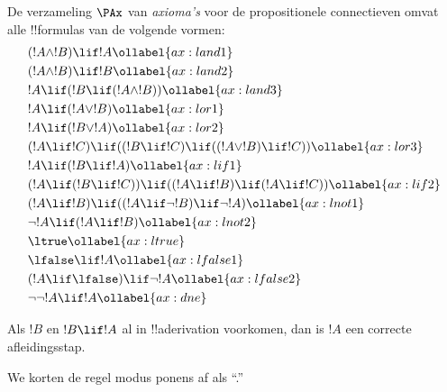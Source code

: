 \documentclass[../../../include/open-logic-section]{subfiles}
\begin{document}
      {}
      {}


\begin{defn}[Axioma's]
De verzameling $\PAx$ van \emph{axioma's} voor de propositionele
connectieven omvat alle !!{formula}s van de volgende vormen:
\begin{align}
  & (!A \land !B) \lif !A \ollabel{ax:land1}\\
  & (!A \land !B) \lif !B \ollabel{ax:land2}\\
  & !A \lif (!B \lif (!A \land !B)) \ollabel{ax:land3}\\
  & !A \lif (!A \lor !B) \ollabel{ax:lor1}\\
  & !A \lif (!B \lor !A) \ollabel{ax:lor2}\\
  & (!A \lif !C) \lif ((!B \lif !C) \lif ((!A \lor !B) \lif !C)) \ollabel{ax:lor3}\\
  & !A \lif (!B \lif !A) \ollabel{ax:lif1}\\
  & (!A \lif (!B \lif !C)) \lif ((!A \lif !B) \lif (!A \lif !C)) \ollabel{ax:lif2}\\
  & (!A \lif !B) \lif ((!A \lif \lnot !B) \lif \lnot !A) \ollabel{ax:lnot1}\\
  & \lnot !A \lif (!A \lif !B) \ollabel{ax:lnot2}\\
  & \ltrue \ollabel{ax:ltrue}\\
  & \lfalse \lif !A \ollabel{ax:lfalse1}\\
  & (!A \lif \lfalse) \lif \lnot !A \ollabel{ax:lfalse2}\\
  & \lnot\lnot !A \lif !A \ollabel{ax:dne}
\end{align}
\end{defn}

\begin{defn}
  Als $!B$ en $!B \lif !A$ al in !!a{derivation} voorkomen, dan is
  $!A$ een correcte afleidingsstap.
\end{defn}

We korten de regel modus ponens af als ``\MP.''
\end{document}
